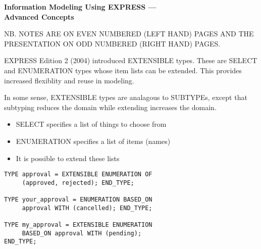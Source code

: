 


\pagestyle{empty}
\bodsiz

\vspace*{\beftit}
\begin{center}
{\titsiz\bfseries Information Modeling Using EXPRESS --- \\ Advanced Concepts}
\end{center}
\vspace{\beftit}
\vspace{\beftit}
\begin{center}
\end{center}

\clearpage

\ifnotes
  \pagestyle{plain}
\else
  \pagestyle{empty}
\fi

\begin{remarks}
\remintro
NB. NOTES ARE ON EVEN NUMBERED (LEFT HAND) PAGES AND THE PRESENTATION ON
ODD NUMBERED (RIGHT HAND) PAGES.


EXPRESS Edition 2 (2004) introduced EXTENSIBLE types. These are
SELECT and ENUMERATION types whose item lists can be extended.
This provides increased flexiblity and reuse in modeling. 

    In some sense, EXTENSIBLE types are analagous to SUBTYPEs, except that 
subtyping reduces the domain while extending increases the domain.

\remend
\end{remarks}



\begin{itemize}
\item SELECT specifies a list of things to choose from
\item ENUMERATION specifies a list of items (names)
\item It is possible to extend these lists
\end{itemize}

\begin{verbatim}
TYPE approval = EXTENSIBLE ENUMERATION OF
     (approved, rejected); END_TYPE;

TYPE your_approval = ENUMERATION BASED_ON
     approval WITH (cancelled); END_TYPE;

TYPE my_approval = EXTENSIBLE ENUMERATION 
     BASED_ON approval WITH (pending); 
END_TYPE;
\end{verbatim}


